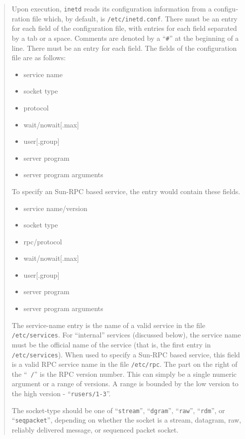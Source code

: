 \begin{appendix}
\begin{english}
\begin{quote}
	Upon execution, {\tt inetd} reads its configuration information from
	a configuration file which, by default, is {\tt /etc/inetd.conf}.
	There must be an entry for each field of the configuration file,
	with entries for each field separated by a tab or a space.  Comments
	are denoted by a ``{\tt \#}'' at the beginning of a line.  There
	must be an entry for each field.  The fields of the configuration
	file are as follows:
	\begin{itemize}
		\item service name
		\item socket type
		\item protocol
 		\item wait/nowait[.max]
		\item user[.group]
		\item server program
		\item server program arguments
	\end{itemize}

	To specify an Sun-RPC based service, the entry would contain these
	fields.
	\begin{itemize}
		\item service name/version
		\item socket type
		\item rpc/protocol
		\item wait/nowait[.max]
		\item user[.group]
		\item server program
		\item server program arguments
	\end{itemize}

	The service-name entry is the name of a valid service in the
	file {\tt /etc/services}. For ``internal'' services (discussed
	below), the service name must be the official name of the service
	(that is, the first entry in {\tt /etc/services}). When used to
	specify a Sun-RPC based service, this field is a valid RPC service
	name in the file {\tt /etc/rpc}. The part on the right of the ``{\tt
	/}'' is the RPC version number. This can simply be a single numeric
	argument or a range of versions. A range is bounded by the low
	version to the high version - ``{\tt rusers/1-3}''.

	The socket-type should be one of ``{\tt stream}'', ``{\tt dgram}'',
	``{\tt raw}'', ``{\tt rdm}'', or ``{\tt seqpacket}'', depending on
	whether the socket is a stream, datagram, raw, reliably delivered
	message, or sequenced packet socket.


\end{quote}
\end{english}
\end{appendix}

